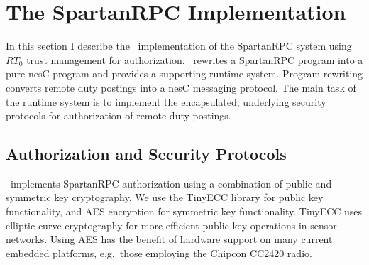 \begin{comment}
In order to invoke this service the wiring as shown in \autoref{figure-secure-wire} could be
made on the client side. Note the activation of the necessary credentials, as well as the
specification of client identity as !NetB!.

\begin{lstlisting}
enable
  "WSNAdmin.control <- NetB.control, 
    NetB.control    <- NetB" as "NetB"
for 
  ClientC.SamplingRate -> [RemoteSelectorC];
\end{lstlisting}
\end{textbox}
\caption{Security Enabled Dynamic Wire}
\label{figure-secure-wire}
\end{figure}

\end{comment}

\section{The SpartanRPC Implementation}
\label{section-implementation}

In this section I describe the \Sprocket\ implementation of the SpartanRPC system using $RT_0$
trust management for authorization. \Sprocket\ rewrites a SpartanRPC program into a pure nesC
program and provides a supporting runtime system. Program rewriting converts remote duty
postings into a nesC messaging protocol. The main task of the runtime system is to implement the
encapsulated, underlying security protocols for authorization of remote duty postings.

\subsection{Authorization and Security Protocols}
\label{section-security-protocols}
\label{section-underlying-protocols}

\Sprocket\ implements SpartanRPC authorization using a combination of public and symmetric key
cryptography. We use the TinyECC library \cite{Liu-Peng-TinyECC-2008} for public key
functionality, and AES encryption for symmetric key functionality. TinyECC uses elliptic curve
cryptography for more efficient public key operations in sensor networks. Using AES has the
benefit of hardware support on many current embedded platforms, e.g.~those employing the Chipcon
CC2420 radio.

